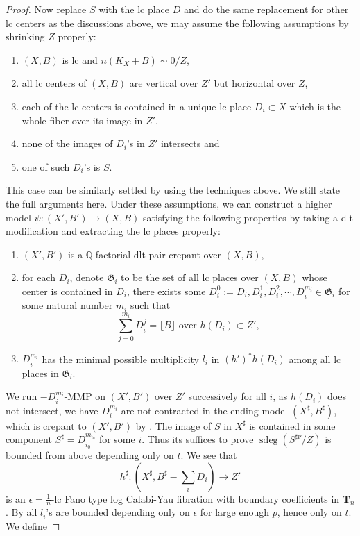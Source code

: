 \documentclass[letterpaper,reqno,12pt]{amsart}
\DeclareMathOperator{\sdeg}{sdeg}
\numberwithin{equation}{section}
\theoremstyle{plain}
\begin{document}
\begin{proof}
Now replace $S$ with the lc place $D$ and do the same replacement for other lc centers as the discussions above, we may assume the following assumptions by shrinking $Z$ properly:
\begin{enumerate}
    \item $(X,B)$ is lc and $n(K_X+B)\sim0/Z$,
    \item all lc centers of $(X,B)$ are vertical over $Z'$ but horizontal over $Z$,
    \item each of the lc centers is contained in a unique lc place $D_i\subset X$ which is the whole fiber over its image in $Z'$,
    \item none of the images of $D_i$'s in $Z'$ intersects and
    \item one of such $D_i$'s is $S$.
\end{enumerate}
This case can be similarly settled by using the techniques above. We still state the full arguments here. Under these assumptions, we can construct a higher model $\psi:(X',B')\to (X,B)$ satisfying the following properties by taking a dlt modification and extracting the lc places properly:
\begin{enumerate}
    \item $(X',B')$ is a $\mathbb Q$-factorial dlt pair crepant over $(X,B)$,
    \item for each $D_i$, denote $\mathfrak G_i$ to be the set of all lc places over $(X,B)$ whose center is contained in $D_i$, there exists some $D_i^0:=D_i,D_i^1,D_i^2,\cdots, D_i^{m_i}\in \mathfrak G_i$ for some natural number $m_i$ such that 
    \[\sum\limits_{j=0}^{m_i}D_i^j=\lfloor B\rfloor\text{ over }h(D_i)\subset Z',\]
    \item $D_i^{m_i}$ has the minimal possible multiplicity $l_i$ in $(h')^*h(D_i)$ among all lc places in $\mathfrak G_i$.
\end{enumerate}
We run $-D_i^{m_i}$-MMP on $(X',B')$ over $Z'$ successively for all $i$, as $h(D_i)$ does not intersect, we have $D_i^{m_i}$ are not contracted in the ending model $(X^\sharp, B^\sharp)$, which is crepant to $(X',B')$ by . The image of $S$ in $X^\sharp$ is contained in some component $S^\sharp=D_{i_0}^{m_{i_0}}$ for some $i$. Thus its suffices to prove $\sdeg(S^{\sharp\nu}/Z)$ is bounded from above depending only on $t$. We see that \[h^\sharp:(X^\sharp, B^\sharp-\sum\limits_i D_i)\to Z'\]
is an $\epsilon=\frac{1}{n}$-lc Fano type log Calabi-Yau fibration with boundary coefficients in $\mathbf T_n$. By  all $l_i$'s are bounded depending only on $\epsilon$ for large enough $p$, hence only on $t$. We define

\end{proof}
\end{document}
